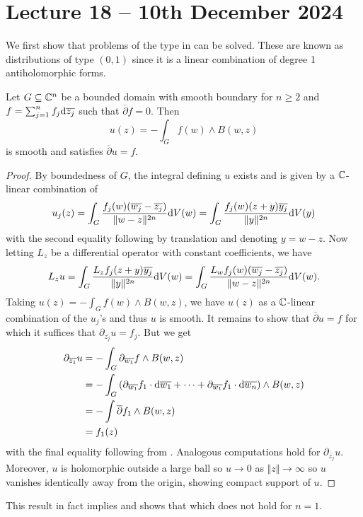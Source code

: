 \section{Lecture 18 -- 10th December 2024}\label{sec: lecture 18}
We first show that problems of the type in  can be solved. These are known as distributions of type $(0,1)$ since it is a linear combination of degree 1 antiholomorphic forms. 
\begin{theorem}\label{thm: solubility of CR01}
    Let $G\subseteq\mathbb{C}^{n}$ be a bounded domain with smooth boundary for $n\geq 2$ and $f=\sum_{j=1}^{n}f_{j}\mathrm{d}\overline{z_{j}}$ such that $\overline{\partial}f=0$. Then 
    $$u(z)=-\int_{G}f(w)\wedge B(w,z)$$
    is smooth and satisfies $\overline{\partial}u=f$. 
\end{theorem}
\begin{proof}
    By boundedness of $G$, the integral defining $u$ exists and is given by a $\mathbb{C}$-linear combination of 
    $$u_{j}(z)=\int_{G}\frac{f_{j}(w)(\overline{w_{j}}-\overline{z_{j}})}{\Vert w-z\Vert^{2n}}\mathrm{d} V(w)=\int_{G}\frac{f_{j}(w)(z+y)\overline{y_{j}}}{\Vert y\Vert^{2n}}\mathrm{d} V(y)$$
    with the second equality following by translation and denoting $y=w-z$. Now letting $L_{z}$ be a differential operator with constant coefficients, we have 
    $$L_{z}u=\int_{G}\frac{L_{z}f_{j}(z+y)\overline{y_{j}}}{\Vert y\Vert^{2n}}\mathrm{d} V(w)=\int_{G}\frac{L_{w}f_{j}(w)(\overline{w_{j}}-\overline{z_{j}})}{\Vert w-z\Vert^{2n}}\mathrm{d} V(w).$$
    Taking $u(z)=-\int_{G}f(w)\wedge B(w,z)$, we have $u(z)$ as a $\mathbb{C}$-linear combination of the $u_{j}$'s and thus $u$ is smooth. It remains to show that $\overline{\partial}u=f$ for which it suffices that $\partial_{\overline{z_{j}}}u=f_{j}$. But we get 
    \begin{align*}
        \partial_{\overline{z_{1}}}u &=-\int_{G}\partial_{\overline{w_{1}}}f\wedge B(w,z) \\
        &= -\int_{G}\left(\partial_{\overline{w_{1}}}f_{1}\cdot\mathrm{d}\overline{w_{1}}+\dots+\partial_{\overline{w_{1}}}f_{1}\cdot\mathrm{d}\overline{w_{n}}\right)\wedge B(w,z) \\
        &= -\int\overline{\partial}f_{1}\wedge B(w,z) \\
        &= f_{1}(z)
    \end{align*}
    with the final equality following from . Analogous computations hold for $\partial_{\overline{z_{j}}}u$. Moreover, $u$ is holomorphic outside a large ball so $u\to0$ as $\Vert z\Vert\to\infty$ so $u$ vanishes identically away from the origin, showing compact support of $u$. 
\end{proof}
This result in fact implies  and shows that  which does not hold for $n=1$. 